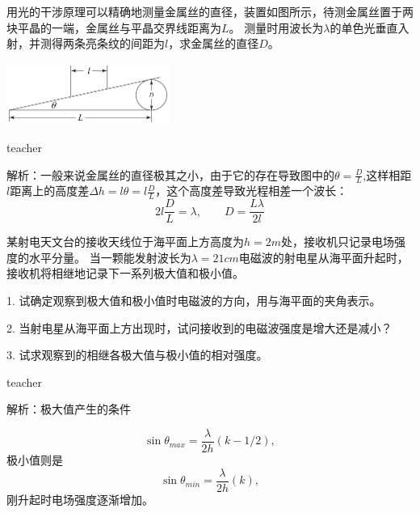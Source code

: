 \begin{example}
	
	用光的干涉原理可以精确地测量金属丝的直径，装置如图所示，待测金属丝置于两块平晶的一端，金属丝与平晶交界线距离为$L$。
	测量时用波长为$\lambda$的单色光垂直入射，并测得两条亮条纹的间距为$l$，求金属丝的直径$D$。
	\begin{flushright}
		\includegraphics[width = 0.4\textwidth]{images/wave-optics-3.pdf} 
	\end{flushright}
	\begin{taggedblock}{teacher}
		
		解析：一般来说金属丝的直径极其之小，由于它的存在导致图中的$\theta = \frac{D}{L}$,这样相距$l$距离上的高度差$\Delta h = l\theta = l\frac{D}{L}$，这个高度差导致光程相差一个波长：
		\[
		2l\frac{D}{L} = \lambda,\qquad D = \frac{L\lambda}{2l}
		\]
	\end{taggedblock}
\end{example}

\begin{example}
某射电天文台的接收天线位于海平面上方高度为$h = 2\si{m}$处，接收机只记录电场强度的水平分量。
当一颗能发射波长为$\lambda = 21\si{cm}$电磁波的射电星从海平面升起时，接收机将相继地记录下一系列极大值和极小值。

1. 试确定观察到极大值和极小值时电磁波的方向，用与海平面的夹角表示。

2. 当射电星从海平面上方出现时，试问接收到的电磁波强度是增大还是减小？

3. 试求观察到的相继各极大值与极小值的相对强度。
	\begin{taggedblock}{teacher}
		
		解析：极大值产生的条件
		
		\[\sin\theta_{max} = \frac{\lambda}{2h}(k-1/2),\]
		极小值则是
			\[\sin\theta_{min} = \frac{\lambda}{2h}(k),\]
			刚升起时电场强度逐渐增加。
	\end{taggedblock}
\end{example}%

